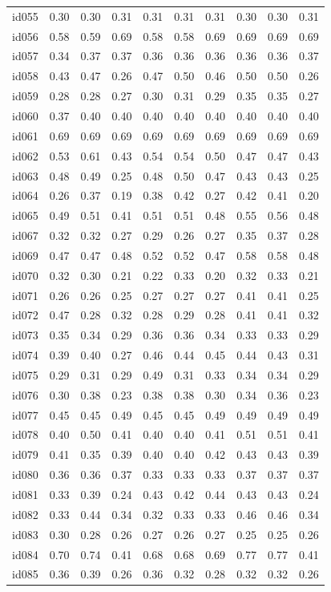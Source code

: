 \begin{tabular}{lrrrrrrrrr}
id055 & 0.30 & 0.30 & 0.31 & 0.31 & 0.31 & 0.31 & 0.30 & 0.30 & 0.31 \\
id056 & 0.58 & 0.59 & 0.69 & 0.58 & 0.58 & 0.69 & 0.69 & 0.69 & 0.69 \\
id057 & 0.34 & 0.37 & 0.37 & 0.36 & 0.36 & 0.36 & 0.36 & 0.36 & 0.37 \\
id058 & 0.43 & 0.47 & 0.26 & 0.47 & 0.50 & 0.46 & 0.50 & 0.50 & 0.26 \\
id059 & 0.28 & 0.28 & 0.27 & 0.30 & 0.31 & 0.29 & 0.35 & 0.35 & 0.27 \\
id060 & 0.37 & 0.40 & 0.40 & 0.40 & 0.40 & 0.40 & 0.40 & 0.40 & 0.40 \\
id061 & 0.69 & 0.69 & 0.69 & 0.69 & 0.69 & 0.69 & 0.69 & 0.69 & 0.69 \\
id062 & 0.53 & 0.61 & 0.43 & 0.54 & 0.54 & 0.50 & 0.47 & 0.47 & 0.43 \\
id063 & 0.48 & 0.49 & 0.25 & 0.48 & 0.50 & 0.47 & 0.43 & 0.43 & 0.25 \\
id064 & 0.26 & 0.37 & 0.19 & 0.38 & 0.42 & 0.27 & 0.42 & 0.41 & 0.20 \\
id065 & 0.49 & 0.51 & 0.41 & 0.51 & 0.51 & 0.48 & 0.55 & 0.56 & 0.48 \\
id067 & 0.32 & 0.32 & 0.27 & 0.29 & 0.26 & 0.27 & 0.35 & 0.37 & 0.28 \\
id069 & 0.47 & 0.47 & 0.48 & 0.52 & 0.52 & 0.47 & 0.58 & 0.58 & 0.48 \\
id070 & 0.32 & 0.30 & 0.21 & 0.22 & 0.33 & 0.20 & 0.32 & 0.33 & 0.21 \\
id071 & 0.26 & 0.26 & 0.25 & 0.27 & 0.27 & 0.27 & 0.41 & 0.41 & 0.25 \\
id072 & 0.47 & 0.28 & 0.32 & 0.28 & 0.29 & 0.28 & 0.41 & 0.41 & 0.32 \\
id073 & 0.35 & 0.34 & 0.29 & 0.36 & 0.36 & 0.34 & 0.33 & 0.33 & 0.29 \\
id074 & 0.39 & 0.40 & 0.27 & 0.46 & 0.44 & 0.45 & 0.44 & 0.43 & 0.31 \\
id075 & 0.29 & 0.31 & 0.29 & 0.49 & 0.31 & 0.33 & 0.34 & 0.34 & 0.29 \\
id076 & 0.30 & 0.38 & 0.23 & 0.38 & 0.38 & 0.30 & 0.34 & 0.36 & 0.23 \\
id077 & 0.45 & 0.45 & 0.49 & 0.45 & 0.45 & 0.49 & 0.49 & 0.49 & 0.49 \\
id078 & 0.40 & 0.50 & 0.41 & 0.40 & 0.40 & 0.41 & 0.51 & 0.51 & 0.41 \\
id079 & 0.41 & 0.35 & 0.39 & 0.40 & 0.40 & 0.42 & 0.43 & 0.43 & 0.39 \\
id080 & 0.36 & 0.36 & 0.37 & 0.33 & 0.33 & 0.33 & 0.37 & 0.37 & 0.37 \\
id081 & 0.33 & 0.39 & 0.24 & 0.43 & 0.42 & 0.44 & 0.43 & 0.43 & 0.24 \\
id082 & 0.33 & 0.44 & 0.34 & 0.32 & 0.33 & 0.33 & 0.46 & 0.46 & 0.34 \\
id083 & 0.30 & 0.28 & 0.26 & 0.27 & 0.26 & 0.27 & 0.25 & 0.25 & 0.26 \\
id084 & 0.70 & 0.74 & 0.41 & 0.68 & 0.68 & 0.69 & 0.77 & 0.77 & 0.41 \\
id085 & 0.36 & 0.39 & 0.26 & 0.36 & 0.32 & 0.28 & 0.32 & 0.32 & 0.26 \\
\bottomrule
\end{tabular}
